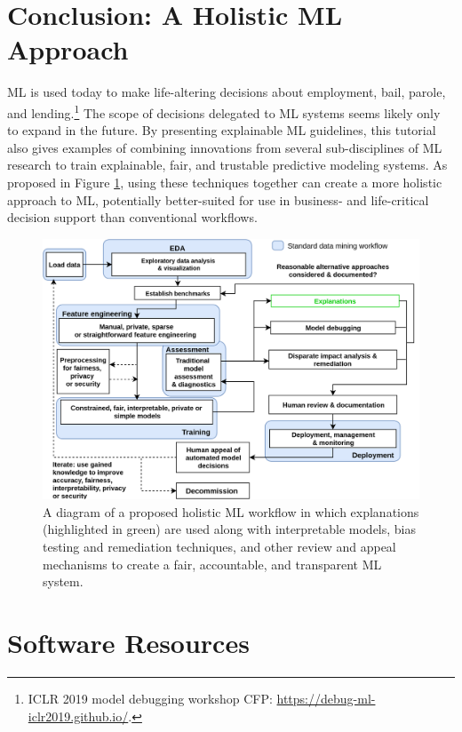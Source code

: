 \documentclass[sigconf]{acmart}
\begin{document}
\section{Conclusion: A Holistic ML Approach} \label{sec:conclusion}

ML is used today to make life-altering decisions about employment, bail, parole, and lending.\footnote{ICLR 2019 model debugging workshop CFP: \url{https://debug-ml-iclr2019.github.io/}.} The scope of decisions delegated to ML systems seems likely only to expand in the future. By presenting explainable ML guidelines, this tutorial also gives examples of combining innovations from several sub-disciplines of ML research to train explainable, fair, and trustable predictive modeling systems. As proposed in Figure \ref{fig:hc_ml}, using these techniques together can create a more holistic approach to ML, potentially better-suited for use in business- and life-critical decision support than conventional workflows.

\begin{figure}[htb!]
	\begin{center}
		\includegraphics[scale=0.1]{img/hc_ml.png}
		\caption{A diagram of a proposed holistic ML workflow in which explanations (highlighted in green) are used along with interpretable models, bias testing and remediation techniques, and other review and appeal mechanisms to create a fair, accountable, and transparent ML system.}
		\label{fig:hc_ml}
	\end{center}
\end{figure}

\section*{Software Resources}
\end{document}
